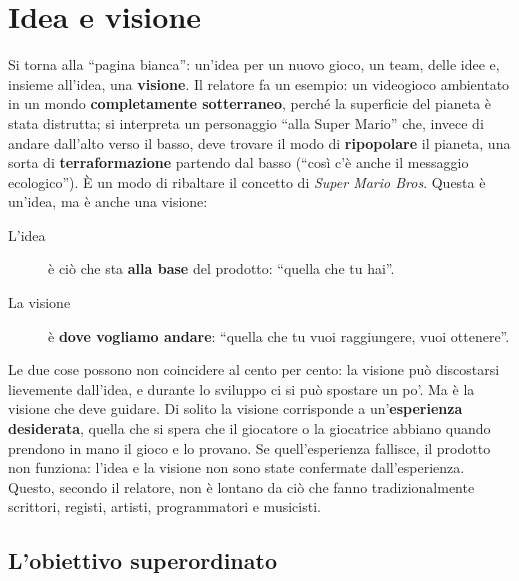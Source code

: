 \section{Idea e visione}
\label{sec:z6-idea-visione}

Si torna alla ``pagina bianca'': un'idea per un nuovo gioco, un team, delle
idee e, insieme all'idea, una \textbf{visione}. Il relatore fa un esempio:
un videogioco ambientato in un mondo \textbf{completamente sotterraneo},
perché la superficie del pianeta è stata distrutta; si interpreta un
personaggio ``alla Super Mario'' che, invece di andare dall'alto verso il basso,
deve trovare il modo di \textbf{ripopolare} il pianeta, una sorta di
\textbf{terraformazione} partendo dal basso (``così c'è anche il messaggio
ecologico''). È un modo di ribaltare il concetto di \emph{Super Mario Bros}.
Questa è un'idea, ma è anche una visione:
\begin{description}
  \item[L'idea] è ciò che sta \textbf{alla base} del prodotto: ``quella che tu
        hai''.
  \item[La visione] è \textbf{dove vogliamo andare}: ``quella che tu vuoi
        raggiungere, vuoi ottenere''.
\end{description}
Le due cose possono non coincidere al cento per cento: la visione può
discostarsi lievemente dall'idea, e durante lo sviluppo ci si può spostare un
po'. Ma è la visione che deve guidare. Di solito la visione corrisponde a
un'\textbf{esperienza desiderata}, quella che si spera che il giocatore o la
giocatrice abbiano quando prendono in mano il gioco e lo provano. Se
quell'esperienza fallisce, il prodotto non funziona: l'idea e la visione non
sono state confermate dall'esperienza. Questo, secondo il relatore, non è
lontano da ciò che fanno tradizionalmente scrittori, registi, artisti,
programmatori e musicisti.

\subsection{L'obiettivo superordinato}

